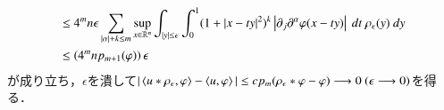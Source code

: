 \begin{prf}
\begin{description}
\begin{align}
					&\leq 4^m n \epsilon \sum_{|\alpha| + k \leq m} 
						\operatorname*{sup}_{x \in \mathbb{R}^n} \int_{|y| \leq \epsilon} \int_0^1 (1+|x-ty|^2)^k \left| \partial_j \partial^\alpha \varphi(x-ty) \right|\ dt\ \rho_\epsilon(y)\ dy \\
					&\leq \left( 4^m n p_{m+1}(\varphi) \right) \epsilon 
				\end{align}
				が成り立ち，$\epsilon$を潰して$|\inprod<u \ast \rho_\epsilon, \varphi> - \inprod<u, \varphi>| 
				\leq c p_m(\rho_\epsilon \ast \varphi - \varphi) \longrightarrow 0\ (\epsilon \longrightarrow 0)$を得る．
				\QED
		\end{description}
	\end{prf}
